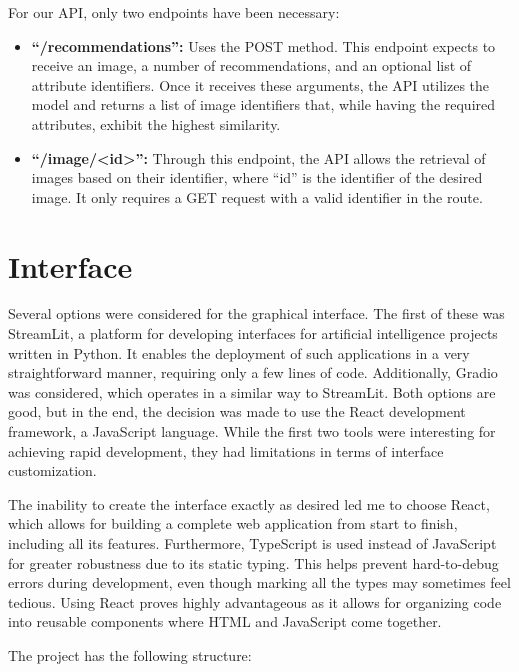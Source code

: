 \documentclass[12pt]{report} %
\begin{document}
For our API, only two endpoints have been necessary:

\begin{itemize}
	\item \textbf{``/recommendations'':}
	Uses the POST method. This endpoint expects to receive an image, a number of recommendations, and an optional list of attribute identifiers. Once it receives these arguments, the API utilizes the model and returns a list of image identifiers that, while having the required attributes, exhibit the highest similarity.
	\item \textbf{``/image/<id>'':}
	Through this endpoint, the API allows the retrieval of images based on their identifier, where ``id'' is the identifier of the desired image. It only requires a GET request with a valid identifier in the route.
\end{itemize}

\section*{Interface}
Several options were considered for the graphical interface. The first of these was StreamLit, a platform for developing interfaces for artificial intelligence projects written in Python. It enables the deployment of such applications in a very straightforward manner, requiring only a few lines of code. Additionally, Gradio was considered, which operates in a similar way to StreamLit. Both options are good, but in the end, the decision was made to use the React development framework, a JavaScript language. While the first two tools were interesting for achieving rapid development, they had limitations in terms of interface customization.

The inability to create the interface exactly as desired led me to choose React, which allows for building a complete web application from start to finish, including all its features. Furthermore, TypeScript is used instead of JavaScript for greater robustness due to its static typing. This helps prevent hard-to-debug errors during development, even though marking all the types may sometimes feel tedious. Using React proves highly advantageous as it allows for organizing code into reusable components where HTML and JavaScript come together.

The project has the following structure:
\end{document}
